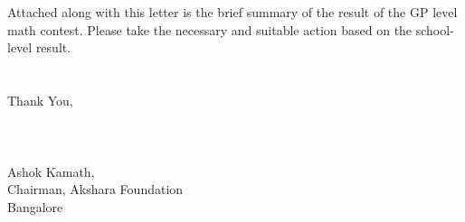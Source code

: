 \documentclass[12pt]{article}
\begin{document}
{\\~\\
Attached along with this letter is the brief summary of the result of the GP level math contest. Please take the necessary and suitable action based on the school-level result.
\\~\\~\\
Thank You,
\\~\\~\\~\\
Ashok Kamath,\\
Chairman, Akshara Foundation\\
Bangalore\\
}

\pagebreak
\end{document}

